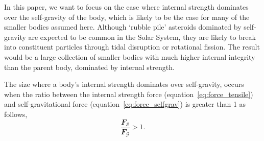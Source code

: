\documentclass[fleqn,usenatbib]{mnras}
\begin{document}
In this paper, we want to focus on the case where internal strength dominates over the self-gravity of the body, which is likely to be the case for many of the smaller bodies assumed here.
Although `rubble pile' asteroids dominated by self-gravity are expected to be common in the Solar System, they are likely to break into constituent particles through tidal disruption or rotational fission. 
The result would be a large collection of smaller bodies with much higher internal integrity than the parent body, dominated by internal strength. 

The size where a body's internal strength dominates over self-gravity, occurs when the ratio between the internal strength force (equation~\ref{eq:force_tensile}) and self-gravitational force (equation~\ref{eq:force_selfgrav}) is greater than 1 as follows, 
\begin{equation}
    \frac{\mathcal{\mathbfit{F}_S}}{\mathcal{\mathbfit{F}_G}} > 1.
    \label{eq:force_ratio}
\end{equation}
\end{document}
